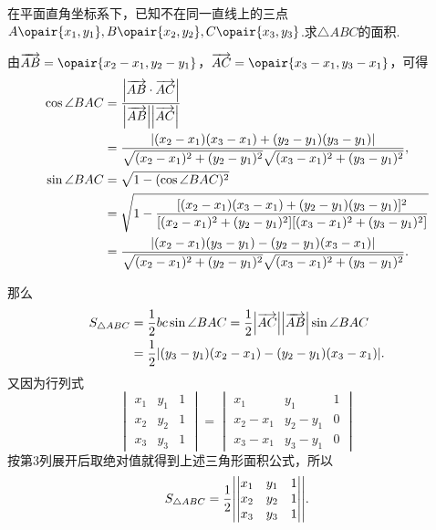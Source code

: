 \begin{example}
在平面直角坐标系下，已知不在同一直线上的三点\(A\opair{x_1,y_1}, \allowbreak B\opair{x_2,y_2}, \allowbreak C\opair{x_3,y_3}\).求\(\triangle ABC\)的面积.
\begin{solution}
由\(\vec{AB}=\opair{x_2-x_1,y_2-y_1}\)，\(\vec{AC}=\opair{x_3-x_1,y_3-x_1}\)，可得\begin{align*}
\cos\angle BAC
&= \frac{\abs{\overrightarrow{AB} \cdot \overrightarrow{AC}}}{\abs{\overrightarrow{AB}} \abs{\overrightarrow{AC}}} \\
&= \frac{
\abs{(x_2-x_1)(x_3-x_1)+(y_2-y_1)(y_3-y_1)}
}{
\sqrt{(x_2-x_1)^2+(y_2-y_1)^2} \sqrt{(x_3-x_1)^2+(y_3-y_1)^2}
}, \\
\sin\angle BAC &= \sqrt{1-(\cos\angle BAC)^2} \\
&= \sqrt{1-\frac{
[(x_2-x_1)(x_3-x_1)+(y_2-y_1)(y_3-y_1)]^2
}{
[(x_2-x_1)^2+(y_2-y_1)^2][(x_3-x_1)^2+(y_3-y_1)^2]
}} \\
&= \frac{
\abs{(x_2-x_1)(y_3-y_1)-(y_2-y_1)(x_3-x_1)}
}{
\sqrt{(x_2-x_1)^2+(y_2-y_1)^2} \sqrt{(x_3-x_1)^2+(y_3-y_1)^2}
}.
\end{align*}

那么\begin{align*}
S_{\triangle ABC} &= \frac{1}{2} b c \sin\angle BAC
= \frac{1}{2} \abs{\overrightarrow{AC}} \abs{\overrightarrow{AB}} \sin\angle BAC \\
&= \frac{1}{2} \abs{(y_3-y_1)(x_2-x_1)-(y_2-y_1)(x_3-x_1)}.
\end{align*}又因为行列式\[
\begin{vmatrix}
x_1 & y_1 & 1 \\
x_2 & y_2 & 1 \\
x_3 & y_3 & 1
\end{vmatrix} = \begin{vmatrix}
x_1 & y_1 & 1 \\
x_2-x_1 & y_2-y_1 & 0 \\
x_3-x_1 & y_3-y_1 & 0
\end{vmatrix}
\]按第3列展开后取绝对值就得到上述三角形面积公式，所以\begin{equation}
S_{\triangle ABC} = \frac{1}{2} \abs{\begin{vmatrix}
x_1 & y_1 & 1 \\
x_2 & y_2 & 1 \\
x_3 & y_3 & 1
\end{vmatrix}}.
\end{equation}
\end{solution}
\end{example}

